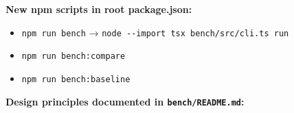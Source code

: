 \textbf{New npm scripts in root package.json:}

\begin{itemize}
\tightlist
\item
  \texttt{n\allowbreak{}p\allowbreak{}m\allowbreak{} \allowbreak{}r\allowbreak{}u\allowbreak{}n\allowbreak{} \allowbreak{}b\allowbreak{}e\allowbreak{}n\allowbreak{}c\allowbreak{}h} → \texttt{n\allowbreak{}o\allowbreak{}d\allowbreak{}e\allowbreak{} \allowbreak{}-\allowbreak{}-\allowbreak{}i\allowbreak{}m\allowbreak{}p\allowbreak{}o\allowbreak{}r\allowbreak{}t\allowbreak{} \allowbreak{}t\allowbreak{}s\allowbreak{}x\allowbreak{} \allowbreak{}b\allowbreak{}e\allowbreak{}n\allowbreak{}c\allowbreak{}h\allowbreak{}/\allowbreak{}s\allowbreak{}r\allowbreak{}c\allowbreak{}/\allowbreak{}c\allowbreak{}l\allowbreak{}i\allowbreak{}.\allowbreak{}t\allowbreak{}s\allowbreak{} \allowbreak{}r\allowbreak{}u\allowbreak{}n}
\item
  \texttt{n\allowbreak{}p\allowbreak{}m\allowbreak{} \allowbreak{}r\allowbreak{}u\allowbreak{}n\allowbreak{} \allowbreak{}b\allowbreak{}e\allowbreak{}n\allowbreak{}c\allowbreak{}h\allowbreak{}:\allowbreak{}c\allowbreak{}o\allowbreak{}m\allowbreak{}p\allowbreak{}a\allowbreak{}r\allowbreak{}e}
\item
  \texttt{n\allowbreak{}p\allowbreak{}m\allowbreak{} \allowbreak{}r\allowbreak{}u\allowbreak{}n\allowbreak{} \allowbreak{}b\allowbreak{}e\allowbreak{}n\allowbreak{}c\allowbreak{}h\allowbreak{}:\allowbreak{}b\allowbreak{}a\allowbreak{}s\allowbreak{}e\allowbreak{}l\allowbreak{}i\allowbreak{}n\allowbreak{}e}
\end{itemize}

\textbf{Design principles documented in \texttt{b\allowbreak{}e\allowbreak{}n\allowbreak{}c\allowbreak{}h\allowbreak{}/\allowbreak{}R\allowbreak{}E\allowbreak{}A\allowbreak{}D\allowbreak{}M\allowbreak{}E\allowbreak{}.\allowbreak{}m\allowbreak{}d}:}

